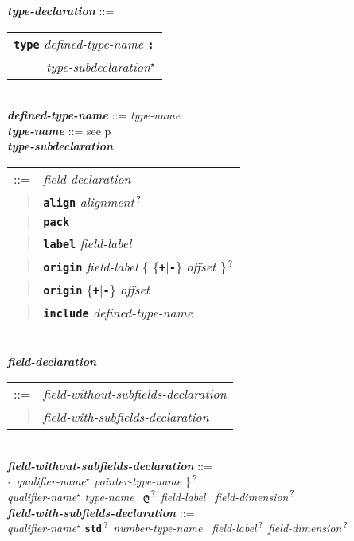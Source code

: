 \documentclass[12pt]{article}
\newcommand{\TT}[1]{{\tt \bfseries #1}}
\newcommand{\STAR}{{\Large $^\star$}}
\newcommand{\QMARK}{{$^{\,\mbox{\footnotesize ?}}$}}
\newcommand{\ttkey}[1]{{\tt \bfseries #1}}
\newcommand{\emkey}[1]{{\em \bfseries #1}}
\newcommand{\pagref}[1]{p\pageref{#1}}
\newenvironment{indpar}[1][0.3in]%
	{\begin{list}{}%
		     {\setlength{\itemsep}{0in}%
		      \setlength{\topsep}{0in}%
		      \setlength{\parsep}{1ex}%
		      \setlength{\labelwidth}{#1}%
		      \setlength{\leftmargin}{#1}%
		      \addtolength{\leftmargin}{\labelsep}}%
	 \item}%
	{\end{list}}
\begin{document}
\begin{indpar}
\emkey{type-declaration}\label{TYPE-DECLARATION}
    ::= \begin{tabular}[t]{l}
        \ttkey{type} {\em defined-type-name} \TT{:} \\
	\TT{~~~~~}{\em type-subdeclaration}\STAR{}
	\end{tabular} \\
\emkey{defined-type-name} ::= {\em type-name} \\
\emkey{type-name} ::= see \pagref{TYPE-NAME}
\\[2ex]
\emkey{type-subdeclaration}
    \begin{tabular}[t]{@{}rl}
    ::= &  {\em field-declaration} \\
    $|$ &  \ttkey{align} {\em alignment}\QMARK{} \\
    $|$ &  \ttkey{pack} \\
    $|$ &  \ttkey{label} {\em field-label} \\
    $|$ &  \ttkey{origin} {\em field-label}
           \{ \{\TT{+}$|$\TT{-}\} {\em offset} \}\QMARK{} \\
    $|$ &  \ttkey{origin} \{\TT{+}$|$\TT{-}\} {\em offset} \\
    $|$ &  \ttkey{include} {\em defined-type-name} \\
    \end{tabular}
\\[2ex]
\emkey{field-declaration}
    \begin{tabular}[t]{@{}rl}
    ::= &  {\em field-without-subfields-declaration} \\
    $|$ &  {\em field-with-subfields-declaration} \\
    \end{tabular}
\\[2ex]
\emkey{field-without-subfields-declaration} ::= \\
\hspace*{0.5in}
        \{ {\em qualifier-name}\STAR{} {\em pointer-type-name} \}\QMARK{} \\
\hspace*{1.0in}
        {\em qualifier-name}\STAR{} {\em type-name}~
        \TT{@}\QMARK{} {\em field-label}~ {\em field-dimension}\QMARK{}
\\[2ex]
\emkey{field-with-subfields-declaration} ::= \\
\hspace*{0.5in}
    {\em qualifier-name}\STAR{}
    \TT{std}\QMARK{} {\em number-type-name}~ {\em field-label}\QMARK{}
                {\em field-dimension}\QMARK{} \\

\end{indpar}
\end{document}
